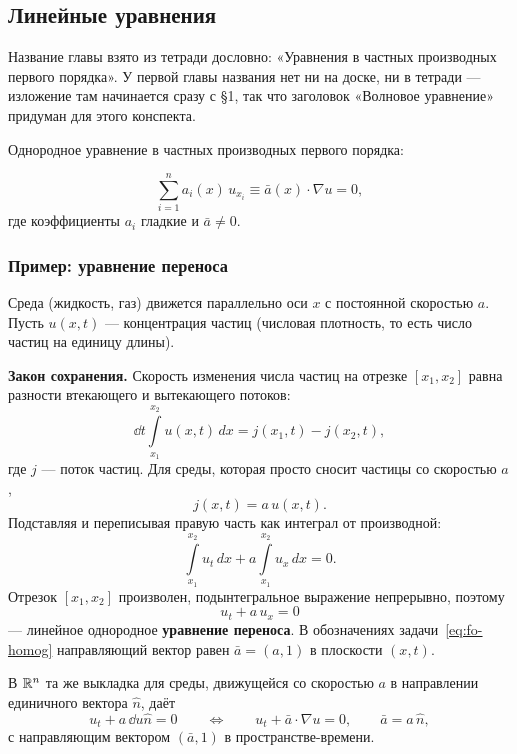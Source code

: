 \subsection{Линейные уравнения}

\begin{warn}
Название главы взято из тетради дословно: «Уравнения в частных производных
первого порядка». У первой главы названия нет ни на доске, ни в тетради —
изложение там начинается сразу с \S1, так что заголовок «Волновое уравнение»
придуман для этого конспекта.
\end{warn}

Однородное уравнение в частных производных первого порядка:

\begin{equation}\tag{1}\label{eq:fo-homog}
  \sum_{i=1}^{n} a_i(x)\, u_{x_i} \equiv \bar a(x) \cdot \nabla u = 0 ,
\end{equation}
где коэффициенты $a_i$ гладкие и $\bar a \ne 0$.


\subsubsection*{Пример: уравнение переноса}

\begin{example}
Среда (жидкость, газ) движется параллельно оси $x$ с постоянной скоростью $a$.
Пусть $u(x,t)$ — концентрация частиц (числовая плотность, то есть число частиц
на единицу длины).

\medskip
\textbf{Закон сохранения.} Скорость изменения числа частиц на отрезке
$[x_1,x_2]$ равна разности втекающего и вытекающего потоков:
\[
  \dd{}{t} \int\limits_{x_1}^{x_2} u(x,t)\, dx = j(x_1,t) - j(x_2,t),
\]
где $j$ — поток частиц. Для среды, которая просто сносит частицы со скоростью
$a$,
\[
  j(x,t) = a\, u(x,t) .
\]
Подставляя и переписывая правую часть как интеграл от производной:
\[
  \int\limits_{x_1}^{x_2} u_t\, dx + a \int\limits_{x_1}^{x_2} u_x\, dx = 0 .
\]
Отрезок $[x_1,x_2]$ произволен, подынтегральное выражение непрерывно, поэтому
\[
  \boxed{\ u_t + a\, u_x = 0\ }
\]
— линейное однородное \textbf{уравнение переноса}. В обозначениях
задачи~\eqref{eq:fo-homog} направляющий вектор равен $\bar a = (a, 1)$ в
плоскости $(x,t)$.
\end{example}


В $\mathbb{R}^n$ та же выкладка для среды, движущейся со скоростью $a$ в направлении
единичного вектора $\hat n$, даёт
\[
  u_t + a\, \dd{u}{\hat n} = 0
  \qquad\Longleftrightarrow\qquad
  u_t + \bar a \cdot \nabla u = 0, \qquad \bar a = a\,\hat n ,
\]
с направляющим вектором $(\bar a, 1)$ в пространстве-времени.

